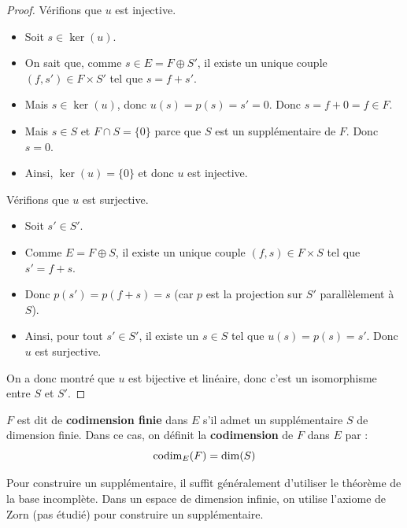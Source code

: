 \documentclass[11pt,a4paper]{report}
\begin{document}
\begin{proof}
    Vérifions que $u$ est injective.
    \begin{itemize}
        \item Soit $s \in \ker(u)$.
        \item On sait que, comme $s \in E = F \oplus S'$, il existe un unique couple $(f,s') \in F \times S'$ tel que $s = f + s'$.
        \item Mais $s \in \ker(u)$, donc $u(s) = p(s) = s' = 0$. Donc $s = f + 0 = f \in F$.
        \item Mais $s \in S$ et $F \cap S = \{0\}$ parce que $S$ est un supplémentaire de $F$. Donc $s = 0$.
        \item Ainsi, $\ker(u) = \{0\}$ et donc $u$ est injective.
    \end{itemize}
    Vérifions que $u$ est surjective.
    \begin{itemize}
        \item Soit $s' \in S'$.
        \item Comme $E = F \oplus S$, il existe un unique couple $(f,s) \in F \times S$ tel que $s' = f + s$.
        \item Donc $p(s') = p(f + s) = s$ (car $p$ est la projection sur $S'$ parallèlement à $S$).
        \item Ainsi, pour tout $s' \in S'$, il existe un $s \in S$ tel que $u(s) = p(s) = s'$. Donc $u$ est surjective.
    \end{itemize}
    On a donc montré que $u$ est bijective et linéaire, donc c'est un isomorphisme entre $S$ et $S'$.
\end{proof}

\begin{definition}[Codimension]
    $F$ est dit de \textbf{codimension finie} dans $E$ s'il admet un supplémentaire $S$ de dimension finie. Dans ce cas, on définit la \textbf{codimension} de $F$ dans $E$ par :
    $$\mathrm{codim}_E(F) = \dim(S)$$
\end{definition}

\begin{methodbox}
    Pour construire un supplémentaire, il suffit généralement d'utiliser le théorème de la base incomplète. Dans un espace de dimension infinie, on utilise l'axiome de Zorn (pas étudié) pour construire un supplémentaire.
\end{methodbox}
\end{document}
